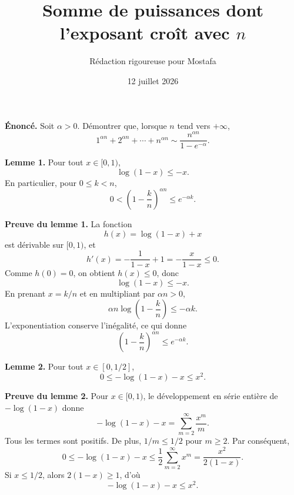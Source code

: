 \documentclass[11pt,a4paper]{article}
\title{\textbf{Somme de puissances dont l'exposant cro\^{i}t avec \(n\)}}
\author{R\'edaction rigoureuse pour Mostafa}
\date{12 juillet 2026}
\begin{document}
\maketitle

\begin{theoremebox}
\textbf{\'Enonc\'e.}
Soit \(\alpha>0\). D\'emontrer que, lorsque \(n\) tend vers
\(+\infty\),
\[
1^{\alpha n}+2^{\alpha n}+\cdots+n^{\alpha n}
\sim
\frac{n^{\alpha n}}{1-e^{-\alpha}}.
\]
\end{theoremebox}

\begin{lemmebox}
\textbf{Lemme 1.}
Pour tout \(x\in[0,1)\),
\[
\log(1-x)\leq -x.
\]
En particulier, pour \(0\leq k<n\),
\[
0<
\left(1-\frac{k}{n}\right)^{\alpha n}
\leq e^{-\alpha k}.
\]
\end{lemmebox}

\begin{preuvebox}
\textbf{Preuve du lemme 1.}
La fonction
\[
h(x)=\log(1-x)+x
\]
est d\'erivable sur \([0,1)\), et
\[
h'(x)=-\frac{1}{1-x}+1=-\frac{x}{1-x}\leq 0.
\]
Comme \(h(0)=0\), on obtient \(h(x)\leq0\), donc
\[
\log(1-x)\leq-x.
\]
En prenant \(x=k/n\) et en multipliant par \(\alpha n>0\),
\[
\alpha n\log\left(1-\frac{k}{n}\right)
\leq-\alpha k.
\]
L'exponentiation conserve l'in\'egalit\'e, ce qui donne
\[
\left(1-\frac{k}{n}\right)^{\alpha n}
\leq e^{-\alpha k}.
\]
\end{preuvebox}

\begin{lemmebox}
\textbf{Lemme 2.}
Pour tout \(x\in[0,1/2]\),
\[
0\leq-\log(1-x)-x\leq x^2.
\]
\end{lemmebox}

\begin{preuvebox}
\textbf{Preuve du lemme 2.}
Pour \(x\in[0,1)\), le d\'eveloppement en s\'erie enti\`ere de
\(-\log(1-x)\) donne
\[
-\log(1-x)-x
=\sum_{m=2}^{\infty}\frac{x^m}{m}.
\]
Tous les termes sont positifs. De plus, \(1/m\leq1/2\) pour
\(m\geq2\). Par cons\'equent,
\[
0\leq-\log(1-x)-x
\leq
\frac12\sum_{m=2}^{\infty}x^m
=
\frac{x^2}{2(1-x)}.
\]
Si \(x\leq1/2\), alors \(2(1-x)\geq1\), d'o\`u
\[
-\log(1-x)-x\leq x^2.
\]
\end{preuvebox}
\end{document}
